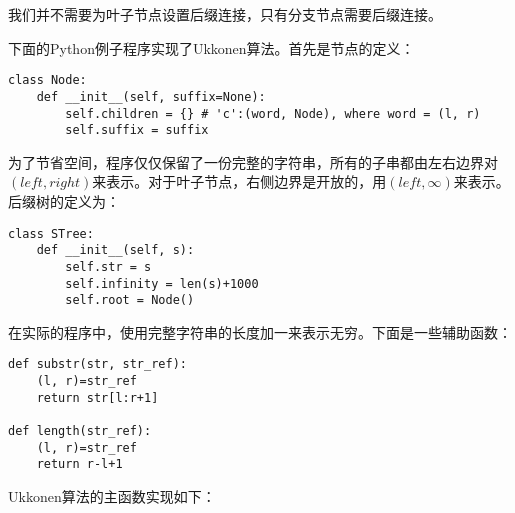 \documentclass[UTF8]{article}
\begin{document}
我们并不需要为叶子节点设置后缀连接，只有分支节点需要后缀连接。

下面的Python例子程序实现了Ukkonen算法。首先是节点的定义：

\lstset{language=Python}
\begin{lstlisting}
class Node:
    def __init__(self, suffix=None):
        self.children = {} # 'c':(word, Node), where word = (l, r)
        self.suffix = suffix
\end{lstlisting}

为了节省空间，程序仅仅保留了一份完整的字符串，所有的子串都由左右边界对$(left, right)$来表示。对于叶子节点，右侧边界是开放的，用$(left, \infty)$来表示。后缀树的定义为：

\begin{lstlisting}
class STree:
    def __init__(self, s):
        self.str = s
        self.infinity = len(s)+1000
        self.root = Node()
\end{lstlisting}

在实际的程序中，使用完整字符串的长度加一来表示无穷。下面是一些辅助函数：

\begin{lstlisting}
def substr(str, str_ref):
    (l, r)=str_ref
    return str[l:r+1]

def length(str_ref):
    (l, r)=str_ref
    return r-l+1
\end{lstlisting}

Ukkonen算法的主函数实现如下：
\end{document}
